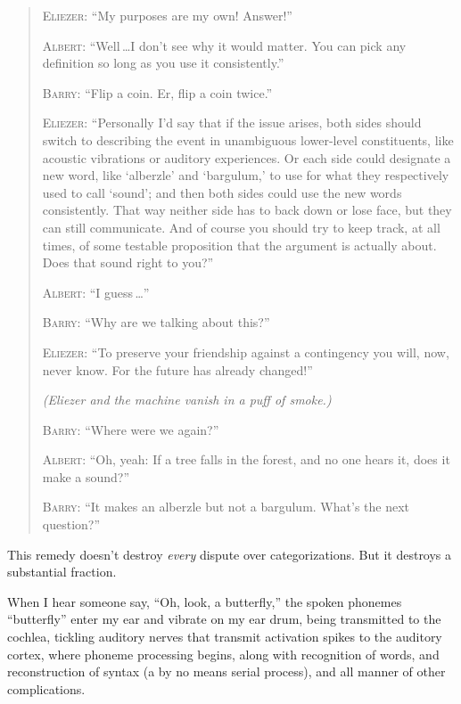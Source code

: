 {{\begin{quotation}
{
 \textsc{Eliezer}: ``My purposes are my own!
Answer!''}

{
 \textsc{Albert}: ``Well\,\ldots I don't see
why it would matter. You can pick any definition so long as you use it
consistently.''}

{
 \textsc{Barry}: ``Flip a coin. Er, flip a coin
twice.''}

{
 \textsc{Eliezer}: ``Personally I'd say
that if the issue arises, both sides should switch to describing the
event in unambiguous lower-level constituents, like acoustic vibrations
or auditory experiences. Or each side could designate a new word, like
`alberzle' and
`bargulum,' to use for what they
respectively used to call `sound'; and
then both sides could use the new words consistently. That way neither
side has to back down or lose face, but they can still communicate. And
of course you should try to keep track, at all times, of some testable
proposition that the argument is actually about. Does that sound right
to you?''}

{
 \textsc{Albert}: ``I guess\,\ldots''}

{
 \textsc{Barry}: ``Why are we talking about
this?''}

{
 \textsc{Eliezer}: ``To preserve your friendship against a
contingency you will, now, never know. For the future has already
changed!''}

{
 \textit{(Eliezer and the machine vanish in a puff of smoke.)}}

{
 \textsc{Barry}: ``Where were we
again?''}

{
 \textsc{Albert}: ``Oh, yeah: If a tree falls in the
forest, and no one hears it, does it make a sound?''}

{
 \textsc{Barry}: ``It makes an alberzle but not a bargulum.
What's the next question?''}
\end{quotation}

{
 This remedy doesn't destroy \textit{every} dispute
over categorizations. But it destroys a substantial fraction.}

\myendsectiontext


{
 When I hear someone say, ``Oh, look, a
butterfly,'' the spoken phonemes
``butterfly'' enter my ear and
vibrate on my ear drum, being transmitted to the cochlea, tickling
auditory nerves that transmit activation spikes to the auditory cortex,
where phoneme processing begins, along with recognition of words, and
reconstruction of syntax (a by no means serial process), and all manner
of other complications. }

}}
